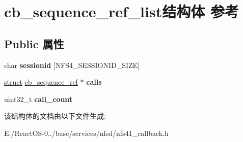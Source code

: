 \hypertarget{structcb__sequence__ref__list}{}\section{cb\+\_\+sequence\+\_\+ref\+\_\+list结构体 参考}
\label{structcb__sequence__ref__list}
\subsection*{Public 属性}
\begin{DoxyCompactItemize}
\item 
\mbox{\label{structcb__sequence__ref__list_a56c18abc2b092f3dec72a5784bd9df97}} 
char {\bfseries sessionid} \mbox{[}N\+F\+S4\+\_\+\+S\+E\+S\+S\+I\+O\+N\+I\+D\+\_\+\+S\+I\+ZE\mbox{]}
\item 
\mbox{\label{structcb__sequence__ref__list_aefbb7ace2c346259107a9a9427ff4c46}} 
\hyperlink{interfacestruct}{struct} \hyperlink{structcb__sequence__ref}{cb\+\_\+sequence\+\_\+ref} $\ast$ {\bfseries calls}
\item 
\mbox{\label{structcb__sequence__ref__list_ab93c4372837094419750c46b118e1538}} 
uint32\+\_\+t {\bfseries call\+\_\+count}
\end{DoxyCompactItemize}


该结构体的文档由以下文件生成\+:\begin{DoxyCompactItemize}
\item 
E\+:/\+React\+O\+S-\/0../base/services/nfsd/nfs41\+\_\+callback.\+h\end{DoxyCompactItemize}
